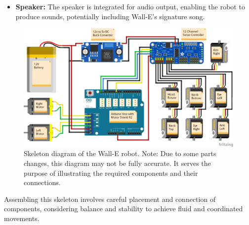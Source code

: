 \documentclass[12pt]{article}
\begin{document}
\begin{itemize}
\begin{itemize}
        \item \textbf{Speaker:} The speaker is integrated for audio output, enabling the robot to produce sounds, potentially including Wall-E's signature song.
    \end{itemize}
    \begin{figure}[H]
        \centering
        \includegraphics[width=0.5\linewidth]{Wall-E-Circuit-Diagram-1024x581.png}
        \caption{Skeleton diagram of the Wall-E robot. Note: Due to some parts changes, this diagram may not be fully accurate. It serves the purpose of illustrating the required components and their connections.}
    \end{figure}
    
    Assembling this skeleton involves careful placement and connection of components, considering balance and stability to achieve fluid and coordinated movements.


\end{itemize}
\end{document}
